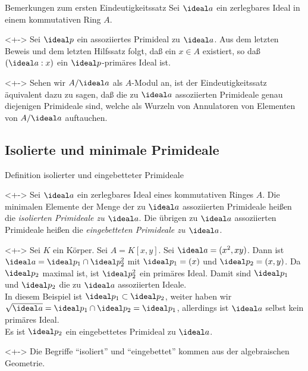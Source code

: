 \begin{frame}{Bemerkungen zum ersten Eindeutigkeitssatz}
	Sei \(\ideal a\) ein zerlegbares Ideal in einem kommutativen Ring \(A\).
	\begin{remark}<+->
		Sei \(\ideal p\) ein assoziiertes Primideal zu \(\ideal a\).
		Aus dem letzten Beweis und dem letzten Hilfssatz folgt, daß ein \(x \in A\) existiert, so daß
		\((\ideal a : x)\) ein \(\ideal p\)-primäres Ideal ist.
	\end{remark}
	\begin{remark}<+->
		Sehen wir \(A/\ideal a\) als \(A\)-Modul an, ist der Eindeutigkeitssatz äquivalent dazu zu sagen, daß die zu
		\(\ideal a\) assoziierten Primideale genau diejenigen Primideale sind, welche als Wurzeln von Annulatoren von Elementen von
		\(A/\ideal a\) auftauchen.
	\end{remark}
\end{frame}

\subsection{Isolierte und minimale Primideale}

\begin{frame}{Definition isolierter und eingebetteter Primideale}
	\begin{definition}<+->
		Sei \(\ideal a\) ein zerlegbares Ideal eines kommutativen Ringes \(A\). Die minimalen Elemente der Menge der zu
		\(\ideal a\) assoziierten Primideale heißen die \emph{isolierten Primideale zu \(\ideal a\)}. Die übrigen zu
		\(\ideal a\) assoziierten Primideale heißen die \emph{eingebetteten Primideale zu \(\ideal a\)}.
	\end{definition}
	\begin{example}<+->
		Sei \(K\) ein Körper. Sei \(A = K[x, y]\). Sei \(\ideal a = (x^2, xy)\). Dann ist \(\ideal a = \ideal p_1 \cap \ideal p_2^2\)
		mit \(\ideal p_1 = (x)\) und \(\ideal p_2 = (x, y)\). Da \(\ideal p_2\) maximal ist, ist \(\ideal p_2^2\) ein primäres
		Ideal. Damit sind \(\ideal p_1\) und \(\ideal p_2\) die zu \(\ideal a\) assoziierten Ideale.
		\\
		In diesem Beispiel ist \(\ideal p_1 \subset \ideal p_2\), weiter haben wir \(\sqrt{\ideal a} = \ideal p_1 \cap \ideal p_2 =
		\ideal p_1\), allerdings ist \(\ideal a\) selbst kein primäres Ideal.
		\\
		Es ist \(\ideal p_2\) ein eingebettetes Primideal zu \(\ideal a\).
	\end{example}
	\begin{visibleenv}<+->
		Die Begriffe "`isoliert"' und "`eingebettet"' kommen aus der algebraischen Geometrie.
	\end{visibleenv}
\end{frame}

